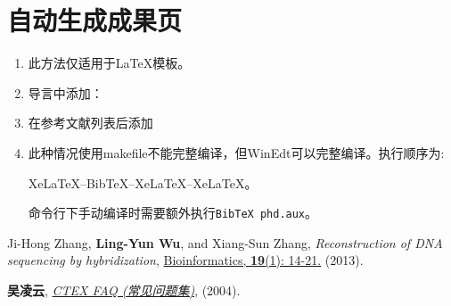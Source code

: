\documentclass[twoside,longtitle]{LZUthesis}
\begin{document}
\section{自动生成成果页}
\begin{enumerate}
\item 此方法仅适用于\LaTeX{}模板。
\item 导言中添加：



\item 在参考文献列表后添加



\item 此种情况使用makefile不能完整编译，但WinEdt可以完整编译。执行顺序为:


Xe\LaTeX{}--Bib\TeX{}--Xe\LaTeX{}--Xe\LaTeX{}。


命令行下手动编译时需要额外执行\lstinline!BibTeX phd.aux!。

\end{enumerate}



\appendix





\begin{publications}{99}
\item Ji-Hong Zhang, \textbf{Ling-Yun Wu}, and Xiang-Sun Zhang, \textit{Reconstruction of DNA sequencing by hybridization}, \href{http://link.aps.org/doi/10.1103/PhysRevA.87.052139}{Bioinformatics, \textbf{19}(1): 14-21.} (2013).
\item \textbf{吴凌云}, \href{http://www.ctex.org/CTeXFAQ}{\textit{CTEX FAQ (常见问题集)}}, (2004).
\end{publications}
\end{document}
